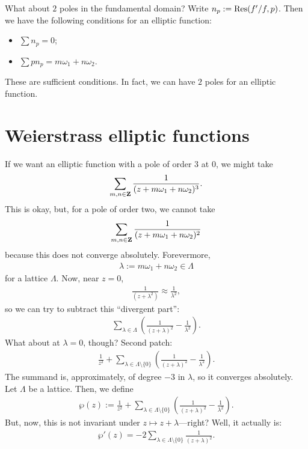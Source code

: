 \documentclass[11pt, oneside,margin=1in]{article}
\begin{document}
What about $2$ poles in the fundamental domain? Write $n_p := \operatorname{Res}(f'/f, p)$. Then we have the following conditions for an elliptic function:
\begin{itemize}
	\item $\sum n_p = 0$;
	\item $\sum p n_p = m\omega_1+n\omega_2$. 
\end{itemize}
These are sufficient conditions. In fact, we can have $2$ poles for an elliptic function. 
\section{Weierstrass elliptic functions}
If we want an elliptic function with a pole of order $3$ at $0$, we might take
\begin{align*}
	\sum_{m,n\in\mathbf Z}^{} \frac{1}{(z+m\omega_1+n\omega_2)^3}.
\end{align*}
This is okay, but, for a pole of order two, we cannot take
\begin{align*}
	\sum_{m,n\in\mathbf Z}^{} \frac{1}{(z+m\omega_1+n\omega_2)^2}
\end{align*}
because this does not converge absolutely. Forevermore, 
\begin{align*}
	\lambda := m\omega_1+n\omega_2 \in \Lambda
\end{align*}
for a lattice $\Lambda$. Now, near $z=0$,
\begin{align*}
	\frac{1}{(z+\lambda^2)}\approx \frac{1}{\lambda^2},
\end{align*}
so we can try to subtract this ``divergent part'':
\begin{align*}
	\sum_{\lambda\in\Lambda}^{} \left(\frac{1}{(z+\lambda) ^2} - \frac{1}{\lambda^2}\right).
\end{align*}
What about at $\lambda = 0$, though? Second patch:
\begin{align*}
	\frac{1}{z^2} + \sum_{\lambda\in\Lambda\setminus\{0\}}^{} \left( \frac{1}{(z+\lambda) ^2}-\frac{1}{\lambda^2} \right) .
\end{align*}
The summand is, approximately, of degree $-3$ in $\lambda$, so it converges absolutely. Let $\Lambda$ be a lattice. Then, we define
\begin{align*}
	 \wp (z) :=  \frac{1}{z^2} + \sum_{\lambda\in \Lambda\setminus\{0\}} \left( \frac{1}{(z+\lambda) ^2}-\frac{1}{\lambda^2} \right). 
\end{align*}
But, now, this is not invariant under $z\longmapsto z+\lambda$---right? Well, it actually is:
\begin{align*}
	\wp'(z) = -2\sum_{\lambda\in\Lambda\setminus\{0\}}^{} \frac{1}{(z+\lambda) ^2}.
\end{align*}
\end{document}
